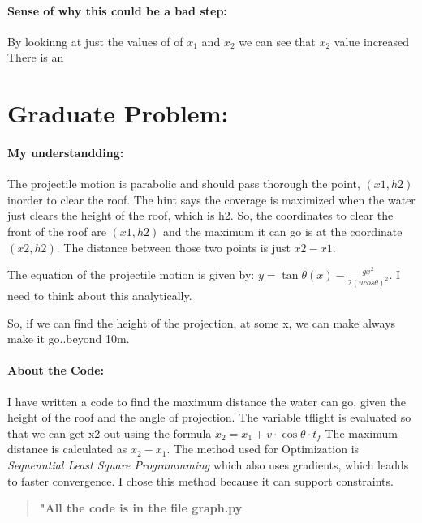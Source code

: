 \documentclass[12pt]{article}
\begin{document}
\paragraph*{Sense of why this could be a bad step: }By lookinng at just the values of of \(x_1\) and \(x_2\) we can see that \(x_2\) value increased \\
There is an 

\section*{Graduate Problem: }
\paragraph*{My understandding:}
The projectile motion is parabolic and should pass thorough the point, \((x1,h2)\) inorder to clear the roof. 
The hint says the coverage is maximized when the water just clears the height of the roof, which is h2.
So, the coordinates to clear the front of the roof are \((x1,h2)\) and the maximum it can go is at the coordinate \((x2,h2)\).
The distance between those two points is just \(x2-x1\). 

The equation of the projectile motion is given by:
\(y = \tan\theta(x) - \frac{gx^2}{2(ucos\theta)^2}\).
I need to think about this analytically. 

So, if we can find the height of the projection, at some x, we can make always make it go..beyond 10m.

\paragraph*{About the Code: }
I have written a code to find the maximum distance the water can go, given the height of the roof and the angle of projection.
The variable tflight is evaluated so that we can get x2 out using the formula \(x_2=x_1 + v \cdot \cos\theta \cdot t_f\)
The maximum distance is calculated as \(x_2 - x_1\).
The method used for Optimization is \textit{Sequenntial Least Square Programmming} which also uses gradients, which leadds to faster convergence. I chose this method because it can support constraints. 

\begin{quote}
    \textbf{"All the code is in the file graph.py}
\end{quote}
\end{document}
